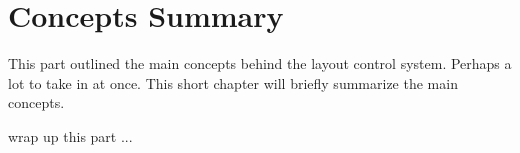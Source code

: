 \chapter{Concepts Summary}

This part outlined the main concepts behind the layout control system. Perhaps a lot to take in at once. This short chapter will briefly summarize the main concepts.

 
wrap up this part ...


